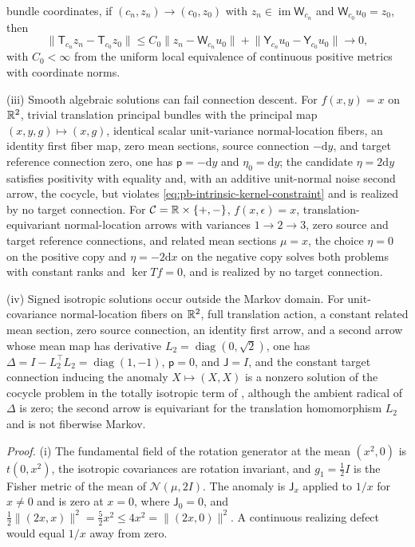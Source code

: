 bundle coordinates, if \((c_n,z_n)\to(c_0,z_0)\) with \(z_n\in\operatorname{im}\mathsf W_{c_n}\) and
\(\mathsf W_{c_0}u_0=z_0\), then
\begin{equation}
\lVert\mathsf T_{c_n}z_n-\mathsf T_{c_0}z_0\rVert
\leq C_0\lVert z_n-\mathsf W_{c_n}u_0\rVert
     +\lVert\mathsf Y_{c_n}u_0-\mathsf Y_{c_0}u_0\rVert\longrightarrow0,
\label{eq:pb-defect-image-continuity}
\end{equation}
with \(C_0<\infty\) from the uniform local equivalence of continuous positive metrics with coordinate
norms.
\par
(iii) Smooth algebraic solutions can fail connection descent. For \(f(x,y)=x\) on \(\mathbb R^2\), trivial
translation principal bundles with the principal map \((x,y,g)\mapsto(x,g)\), identical scalar
unit-variance normal-location fibers, an identity first fiber map, zero mean sections, source connection
\(-\mathrm dy\), and target reference connection zero, one has \(\mathsf p=-\mathrm dy\) and
\(\eta_0=\mathrm dy\); the candidate \(\eta=2\mathrm dy\) satisfies positivity with equality and, with an
additive unit-normal noise second arrow, the cocycle, but violates
\eqref{eq:pb-intrinsic-kernel-constraint} and is realized by no target connection. For
\(\mathcal C=\mathbb R\times\{+,-\}\), \(f(x,\epsilon)=x\), translation-equivariant normal-location arrows with
variances \(1\to2\to3\), zero source and target reference connections, and related mean sections
\(\mu=x\), the choice \(\eta=0\) on the positive copy and \(\eta=-2\mathrm dx\) on the negative copy solves
both problems with constant ranks and \(\ker Tf=0\), and is realized by no target connection.
\par
(iv) Signed isotropic solutions occur outside the Markov domain. For unit-covariance normal-location
fibers on \(\mathbb R^2\), full translation action, a constant related mean section, zero source connection, an
identity first arrow, and a second arrow whose mean map has derivative
\(L_2=\operatorname{diag}(0,\sqrt2)\), one has \(\Delta=I-L_2^\top L_2=\operatorname{diag}(1,-1)\),
\(\mathsf p=0\), and \(\mathsf J=I\), and the constant target connection inducing the anomaly
\(X\mapsto(X,X)\) is a nonzero solution of the cocycle problem in the totally isotropic term of
, although the ambient radical of \(\Delta\) is zero; the second arrow is
equivariant for the translation homomorphism \(L_2\) and is not fiberwise Markov. 

\noindent\emph{Proof.}
(i) The fundamental field of the rotation generator at the mean \((x^2,0)\) is \(t(0,x^2)\), the isotropic
covariances are rotation invariant, and \(g_1=\tfrac12I\) is the Fisher metric of the mean of
\(\mathcal N(\mu,2I)\). The anomaly is \(\mathsf J_x\) applied to \(1/x\) for \(x\ne0\) and is zero at
\(x=0\), where \(\mathsf J_0=0\), and
\(\tfrac12\lVert(2x,x)\rVert^2=\tfrac52x^2\leq4x^2=\lVert(2x,0)\rVert^2\). A continuous realizing defect
would equal \(1/x\) away from zero.

